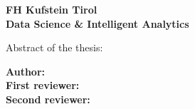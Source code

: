 \thispagestyle{empty}

\textbf{FH Kufstein Tirol\\Data Science \& Intelligent Analytics}

Abstract of the thesis: \textbf{\mytitle}

\textbf{Author:} \myname\\
\textbf{First reviewer:} \myfirstreviewer\\
\textbf{Second reviewer:} \mysecondreviewer\\

\Blindtext[2][1]

\mydate{}
